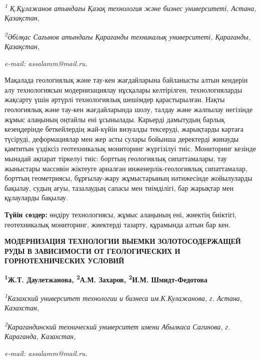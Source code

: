\begin{affiliation}
\emph{\textsuperscript{1} Қ.Құлажанов атындағы Қазақ технология және бизнес университеті, Астана, Қазақстан,}

\emph{\textsuperscript{2}Әбілқас Сағынов атындағы Қарағанды техникалық университеті, Қарағанды, Қазақстан,}

\emph{e-mail: assalamm@mail.ru.}
\end{affiliation}

Мақалада геологиялық және тау-кен жағдайларына байланысты алтын кендерін
алу технологиясын модернизациялау нұсқалары келтірілген, технологияларды
жақсарту үшін әртүрлі технологиялық шешімдер қарастырылған. Нақты
геологиялық және тау-кен жағдайларында шолу, талдау және жалпылау
негізінде жұмыс алаңының оңтайлы ені ұсынылады. Карьерді дамытудың
барлық кезеңдерінде беткейлердің жай-күйін визуалды тексеруді,
жарықтарды картаға түсіруді, деформациялар мен жер асты сулары бойынша
деректерді жинауды қамтитын үздіксіз геотехникалық мониторинг жүргізілуі
тиіс. Мониторинг кезінде мынадай ақпарат тіркелуі тиіс: борттың
геологиялық сипаттамалары, тау жыныстары массивін жіктеуге арналған
инженерлік-геологиялық сипаттамалар, борттың геометриясы, бұрғылау-жару
жұмыстарының нәтижесінде жойылуларды бақылау, судың ағуы, тазалаудың
сапасы мен тиімділігі, бар жарықтар мен құлауларды бақылау.

{\bfseries Түйін сөздер:} өндіру технологиясы, жұмыс алаңының ені, жиектің
биіктігі, геотехникалық мониторинг, жиектерді тазарту, құрамында алтын
бар кен.

\begin{articleheader}
{\bfseries МОДЕРНИЗАЦИЯ ТЕХНОЛОГИИ ВЫЕМКИ ЗОЛОТОСОДЕРЖАЩЕЙ РУДЫ В ЗАВИСИМОСТИ ОТ ГЕОЛОГИЧЕСКИХ И ГОРНОТЕХНИЧЕСКИХ УСЛОВИЙ}

{\bfseries
\textsuperscript{1}Ж.Т. Даулетжанова,
\textsuperscript{2}А.М. Захаров\textsuperscript{\envelope },
\textsuperscript{2}И.М. Шмидт-Федотова}
\end{articleheader}

\begin{affiliation}
\emph{\textsuperscript{1}Казахский университет технологии и бизнеса им.К.Кулажанова, г. Астана, Казахстан,}

\emph{\textsuperscript{2}Карагандинский технический университет имени Абылкаса Сагинова, г. Караганда, Казахстан,}

\emph{e-mail: assalamm@mail.ru.}
\end{affiliation}

